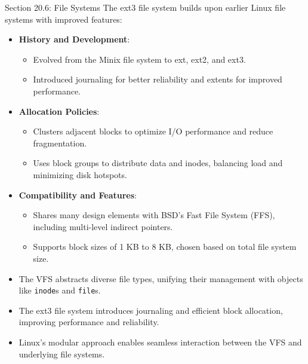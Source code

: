 \begin{notes}{Section 20.6: File Systems}
    The ext3 file system builds upon earlier Linux file systems with improved features:
    \begin{itemize}
        \item \textbf{History and Development}:
        \begin{itemize}
            \item Evolved from the Minix file system to ext, ext2, and ext3.
            \item Introduced journaling for better reliability and extents for improved performance.
        \end{itemize}
        \item \textbf{Allocation Policies}:
        \begin{itemize}
            \item Clusters adjacent blocks to optimize I/O performance and reduce fragmentation.
            \item Uses block groups to distribute data and inodes, balancing load and minimizing disk hotspots.
        \end{itemize}
        \item \textbf{Compatibility and Features}:
        \begin{itemize}
            \item Shares many design elements with BSD's Fast File System (FFS), including multi-level indirect pointers.
            \item Supports block sizes of 1 KB to 8 KB, chosen based on total file system size.
        \end{itemize}
    \end{itemize}
    
    \begin{highlight}
        \begin{itemize}
            \item The VFS abstracts diverse file types, unifying their management with objects like \texttt{inode}s and \texttt{file}s.
            \item The ext3 file system introduces journaling and efficient block allocation, improving performance and reliability.
            \item Linux's modular approach enables seamless interaction between the VFS and underlying file systems.
        \end{itemize}
    \end{highlight}
\end{notes}

